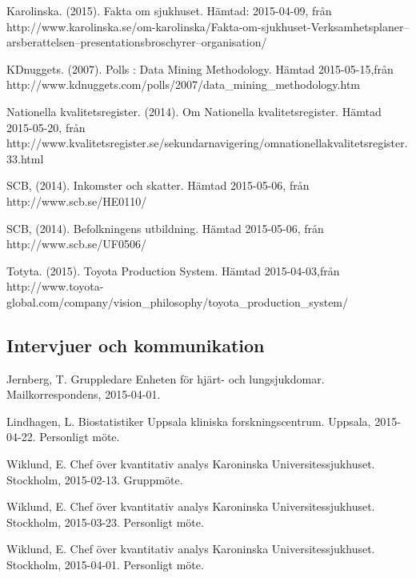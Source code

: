Karolinska. (2015). Fakta om sjukhuset. Hämtad: 2015-04-09, från http://www.karolinska.se/om-karolinska/Fakta-om-sjukhuset-Verksamhetsplaner--arsberattelsen--presentationsbroschyrer--organisation/\newline				

KDnuggets. (2007). Polls : Data Mining Methodology. Hämtad 2015-05-15,\newline från http://www.kdnuggets.com/polls/2007/data\_mining\_methodology.htm\newline

Nationella kvalitetsregister. (2014). Om Nationella kvalitetsregister. Hämtad 2015-05-20, från http://www.kvalitetsregister.se/sekundarnavigering/omnationellakvalitetsregister.33.html\newline

SCB, (2014). Inkomster och skatter. Hämtad 2015-05-06, från http://www.scb.se/HE0110/\newline

SCB, (2014). Befolkningens utbildning. Hämtad 2015-05-06, från http://www.scb.se/UF0506/\newline

Totyta. (2015). Toyota Production System. Hämtad 2015-04-03,\newline från http://www.toyota-global.com/company/vision\_philosophy/toyota\_production\_system/\newline

\subsection{Intervjuer och kommunikation} 
	 	 		
Jernberg, T. Gruppledare Enheten för hjärt- och lungsjukdomar. Mailkorrespondens, 2015-04-01.	\newline				

Lindhagen, L. Biostatistiker Uppsala kliniska forskningscentrum. Uppsala, 2015-04-22. Personligt möte.\newline

Wiklund, E. Chef över kvantitativ analys Karoninska Universitessjukhuset. Stockholm, 2015-02-13. Gruppmöte.\newline

Wiklund, E. Chef över kvantitativ analys Karoninska Universitessjukhuset. Stockholm, 2015-03-23. Personligt möte.\newline

Wiklund, E. Chef över kvantitativ analys Karoninska Universitessjukhuset. Stockholm, 2015-04-01. Personligt möte.\newline


